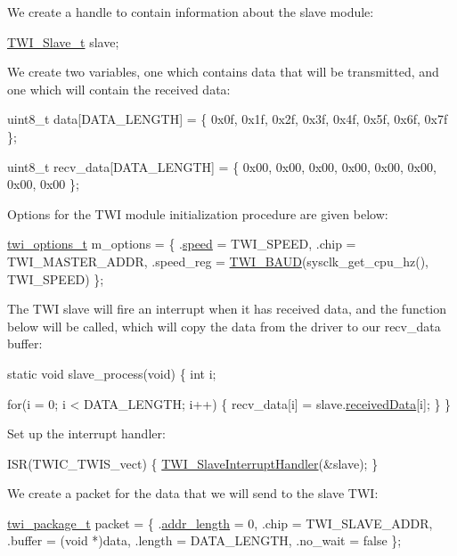 We create a handle to contain information about the slave module\-: 
\begin{DoxyCode}
        \hyperlink{struct_t_w_i___slave}{TWI\_Slave\_t} slave;
\end{DoxyCode}


We create two variables, one which contains data that will be transmitted, and one which will contain the received data\-: 
\begin{DoxyCode}
         uint8\_t data[DATA\_LENGTH] = \{
             0x0f, 0x1f, 0x2f, 0x3f, 0x4f, 0x5f, 0x6f, 0x7f
         \};

         uint8\_t recv\_data[DATA\_LENGTH] = \{
             0x00, 0x00, 0x00, 0x00, 0x00, 0x00, 0x00, 0x00
         \};
\end{DoxyCode}


Options for the T\-W\-I module initialization procedure are given below\-: 
\begin{DoxyCode}
        \hyperlink{structtwi__options__t}{twi\_options\_t} m\_options = \{
            .\hyperlink{structtwi__options__t_ad81e7400d394a2f72d7ad84588d3d661}{speed}     = TWI\_SPEED,
            .chip      = TWI\_MASTER\_ADDR,
            .speed\_reg = \hyperlink{group__group__xmega__drivers__twi__twim_gaf373fdbc2054cf1a070ba2a24ddaedf3}{TWI\_BAUD}(sysclk\_get\_cpu\_hz(), TWI\_SPEED)
        \};
\end{DoxyCode}


The T\-W\-I slave will fire an interrupt when it has received data, and the function below will be called, which will copy the data from the driver to our recv\-\_\-data buffer\-: 
\begin{DoxyCode}
         \textcolor{keyword}{static} \textcolor{keywordtype}{void} slave\_process(\textcolor{keywordtype}{void}) \{
             \textcolor{keywordtype}{int} i;

             \textcolor{keywordflow}{for}(i = 0; i < DATA\_LENGTH; i++) \{
                 recv\_data[i] = slave.\hyperlink{struct_t_w_i___slave_a8c205728fdea8bcaeaa0f6f889d83d4d}{receivedData}[i];
             \}
         \}
\end{DoxyCode}


Set up the interrupt handler\-: 
\begin{DoxyCode}
        ISR(TWIC\_TWIS\_vect) \{
            \hyperlink{group__group__xmega__drivers__twi__twis_ga0b140fb1b0b3f204e5c748c5f585fbb2}{TWI\_SlaveInterruptHandler}(&slave);
        \}
\end{DoxyCode}


We create a packet for the data that we will send to the slave T\-W\-I\-: 
\begin{DoxyCode}
        \hyperlink{structtwi__package__t}{twi\_package\_t} packet = \{
            .\hyperlink{structtwi__package__t_a397e982e6fa809c3fb834309537ffdbd}{addr\_length} = 0,
            .chip        = TWI\_SLAVE\_ADDR,
            .buffer      = (\textcolor{keywordtype}{void} *)data,
            .length      = DATA\_LENGTH,
            .no\_wait     = \textcolor{keyword}{false}
        \};
\end{DoxyCode}


